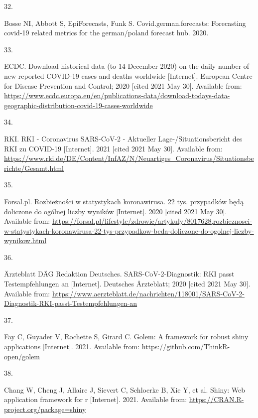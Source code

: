 \documentclass[
]{article}
\newlength{\cslhangindent}
\newlength{\csllabelwidth}
\newlength{\cslentryspacingunit} %
\newenvironment{CSLReferences}[2] %
 {%
  \setlength{\parindent}{0pt}
  \ifodd #1
  \let\oldpar\par
  \def\par{\hangindent=\cslhangindent\oldpar}
  \fi
  \setlength{\parskip}{#2\cslentryspacingunit}
 }%
 {}
\newcommand{\CSLLeftMargin}[1]{\parbox[t]{\csllabelwidth}{#1}}
\newcommand{\CSLRightInline}[1]{\parbox[t]{\linewidth - \csllabelwidth}{#1}\break}
\begin{document}
\begin{CSLReferences}{0}{0}
\leavevmode{}%
\CSLLeftMargin{32. }
\CSLRightInline{Bosse NI, Abbott S, EpiForecasts, Funk S. Covid.german.forecasts: Forecasting covid-19 related metrics for the german/poland forecast hub. 2020. }

\leavevmode{}%
\CSLLeftMargin{33. }
\CSLRightInline{ECDC. Download historical data (to 14 {December} 2020) on the daily number of new reported {COVID-19} cases and deaths worldwide {[}Internet{]}. {European Centre for Disease Prevention and Control}; 2020 {[}cited 2021 May 30{]}. Available from: \url{https://www.ecdc.europa.eu/en/publications-data/download-todays-data-geographic-distribution-covid-19-cases-worldwide}}

\leavevmode{}%
\CSLLeftMargin{34. }
\CSLRightInline{RKI. {RKI} - {Coronavirus SARS-CoV-2} - {Aktueller Lage-}/{Situationsbericht} des {RKI} zu {COVID-19} {[}Internet{]}. 2021 {[}cited 2021 May 30{]}. Available from: \url{https://www.rki.de/DE/Content/InfAZ/N/Neuartiges_Coronavirus/Situationsberichte/Gesamt.html}}

\leavevmode{}%
\CSLLeftMargin{35. }
\CSLRightInline{Forsal.pl. Rozbieżności w statystykach koronawirusa. 22 tys. przypadków będą doliczone do ogólnej liczby wyników {[}Internet{]}. 2020 {[}cited 2021 May 30{]}. Available from: \url{https://forsal.pl/lifestyle/zdrowie/artykuly/8017628,rozbieznosci-w-statystykach-koronawirusa-22-tys-przypadkow-beda-doliczone-do-ogolnej-liczby-wynikow.html}}

\leavevmode{}%
\CSLLeftMargin{36. }
\CSLRightInline{Ärzteblatt DÄG Redaktion Deutsches. SARS-CoV-2-Diagnostik: RKI passt Testempfehlungen an {[}Internet{]}. {Deutsches Ärzteblatt}; 2020 {[}cited 2021 May 30{]}. Available from: \url{https://www.aerzteblatt.de/nachrichten/118001/SARS-CoV-2-Diagnostik-RKI-passt-Testempfehlungen-an}}

\leavevmode{}%
\CSLLeftMargin{37. }
\CSLRightInline{Fay C, Guyader V, Rochette S, Girard C. Golem: A framework for robust shiny applications {[}Internet{]}. 2021. Available from: \url{https://github.com/ThinkR-open/golem}}

\leavevmode{}%
\CSLLeftMargin{38. }
\CSLRightInline{Chang W, Cheng J, Allaire J, Sievert C, Schloerke B, Xie Y, et al. Shiny: Web application framework for r {[}Internet{]}. 2021. Available from: \url{https://CRAN.R-project.org/package=shiny}}


\end{CSLReferences}
\end{document}
